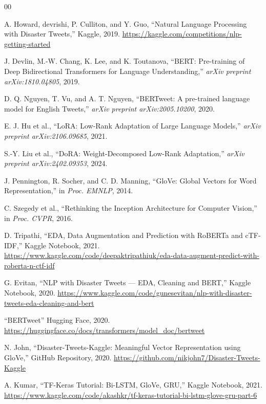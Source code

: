 \documentclass[conference]{IEEEtran}
\begin{document}
\begin{thebibliography}{00}

A. Howard, devrishi, P. Culliton, and Y. Guo,
``Natural Language Processing with Disaster Tweets,''
Kaggle, 2019.
\url{https://kaggle.com/competitions/nlp-getting-started}

J. Devlin, M.-W. Chang, K. Lee, and K. Toutanova,
``BERT: Pre-training of Deep Bidirectional Transformers for Language
Understanding,''
\textit{arXiv preprint arXiv:1810.04805}, 2019.

D. Q. Nguyen, T. Vu, and A. T. Nguyen,
``BERTweet: A pre-trained language model for English Tweets,''
\textit{arXiv preprint arXiv:2005.10200}, 2020.

E. J. Hu et al.,
``LoRA: Low-Rank Adaptation of Large Language Models,''
\textit{arXiv preprint arXiv:2106.09685}, 2021.

S.-Y. Liu et al.,
``DoRA: Weight-Decomposed Low-Rank Adaptation,''
\textit{arXiv preprint arXiv:2402.09353}, 2024.

J. Pennington, R. Socher, and C. D. Manning,
``GloVe: Global Vectors for Word Representation,''
in \textit{Proc. EMNLP}, 2014.

C. Szegedy et al.,
``Rethinking the Inception Architecture for Computer Vision,''
in \textit{Proc. CVPR}, 2016.

D. Tripathi,
``EDA, Data Augmentation and Prediction with RoBERTa and cTF-IDF,''
Kaggle Notebook, 2021.
\url{https://www.kaggle.com/code/deepaktripathiuk/eda-data-augment-predict-with-roberta-n-ctf-idf}

G. Evitan,
``NLP with Disaster Tweets — EDA, Cleaning and BERT,''
Kaggle Notebook, 2020.
\url{https://www.kaggle.com/code/gunesevitan/nlp-with-disaster-tweets-eda-cleaning-and-bert}

``BERTweet''
Hugging Face, 2020.
\url{https://huggingface.co/docs/transformers/model_doc/bertweet}

N. John,
``Disaster-Tweets-Kaggle: Meaningful Vector Representation using GloVe,''
GitHub Repository, 2020.
\url{https://github.com/nikjohn7/Disaster-Tweets-Kaggle}

A. Kumar,
``TF-Keras Tutorial: Bi-LSTM, GloVe, GRU,''
Kaggle Notebook, 2021.
\url{https://www.kaggle.com/code/akashkr/tf-keras-tutorial-bi-lstm-glove-gru-part-6}


\end{thebibliography}
\end{document}
